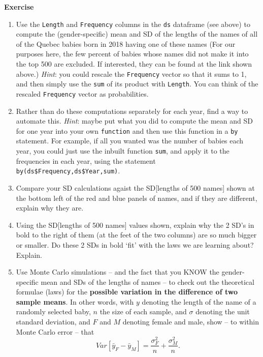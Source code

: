 \documentclass[]{book}
\begin{document}
\textbf{Exercise}

\begin{enumerate}
\def\labelenumi{\arabic{enumi}.}
\item
  Use the \texttt{Length} and \texttt{Frequency} columns in the \texttt{ds} dataframe (see above) to compute the (gender-specific) mean and SD of the lengths of the names of all of the Quebec babies born in 2018 having one of these names (For our purposes here, the few percent of babies whose names did not make it into the top 500 are excluded. If interested, they can be found at the link shown above.) \emph{Hint}: you could rescale the \texttt{Frequency} vector so that it sums to 1, and then simply use the \texttt{sum} of its product with \texttt{Length}. You can think of the rescaled \texttt{Frequency} vector as probabilities.
\item
  Rather than do these computations separately for each year, find a way to automate this. \emph{Hint}: maybe put what you did to compute the mean and SD for one year into your own \texttt{function} and then use this function in a \texttt{by} statement. For example, if all you wanted was the number of babies each year, you could just use the inbuilt function \texttt{sum}, and apply it to the frequencies in each year, using the statement \texttt{by(ds\$Frequency,ds\$Year,sum)}.
\item
  Compare your SD calculations agaist the SD{[}lengths of 500 names{]} shown at the bottom left of the red and blue panels of names, and if they are different, explain why they are.
\item
  Using the SD{[}lengths of 500 names{]} values shown, explain why the 2 SD's in bold to the right of them (at the feet of the two columns) are so much bigger or smaller. Do these 2 SDs in bold `fit' with the laws we are learning about? Explain.
\item
  Use Monte Carlo simulations -- and the fact that you KNOW the gender-specific mean and SDs of the lengths of names -- to check out the theoretical formulae (laws) for the \textbf{possible variation in the difference of two sample means}. In other words, with \(y\) denoting the length of the name of a randomly selected baby, \(n\) the size of each sample, and \(\sigma\) denoting the unit standard deviation, and \(F\) and \(M\) denoting female and male, show -- to within Monte Carlo error -- that
  \[ Var[ \bar{y}_{F} - \bar{y}_{M} ] = \frac{\sigma^2_{F}}{n} + \frac{\sigma^2_{M}}{n}.\]

\end{enumerate}
\end{document}
